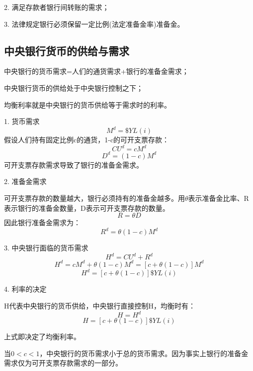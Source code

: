 \documentclass{article}
\begin{document}
2. 满足存款者银行间转账的需求；

3. 法律规定银行必须保留一定比例(法定准备金率)准备金。

\subsection{中央银行货币的供给与需求}
中央银行的货币需求=人们的通货需求+银行的准备金需求；

中央银行货币的供给处于中央银行控制之下；

均衡利率就是中央银行的货币供给等于需求时的利率。

\hspace*{\fill}

1. 货币需求
\[
M^d=\$YL(i)
\]
假设人们持有固定比例c的通货，1-c的可开支票存款：
\[
CU^d=cM^d
\]
\[
D^d=(1-c)M^d
\]
可开支票存款需求导致了银行的准备金需求。

\hspace*{\fill}

2. 准备金需求

可开支票存款的数量越大，银行必须持有的准备金越多。用$ \theta $表示准备金比率、R表示银行的准备金数量，D表示可开支票存款的数量。
\[
R=\theta D
\]
因此银行准备金需求为：
\[
R^d=\theta(1-c)M^d
\]

\hspace*{\fill}

3. 中央银行面临的货币需求
\[
H^d=CU^d+R^d
\]
\[
H^d=cM^d+\theta(1-c)M^d=[c+\theta(1-c)]M^d
\]
\[
H^d=[c+\theta(1-c)]\$YL(i)
\]

\hspace*{\fill}

4. 利率的决定

H代表中央银行的货币供给，中央银行直接控制H，均衡时有：
\[
H=H^d
\]
\[
H=[c+\theta(1-c)]\$YL(i)
\]

上式即决定了均衡利率。

当$ 0<c<1 $，中央银行的货币需求小于总的货币需求。因为事实上银行的准备金需求仅为可开支票存款需求的一部分。
\end{document}
